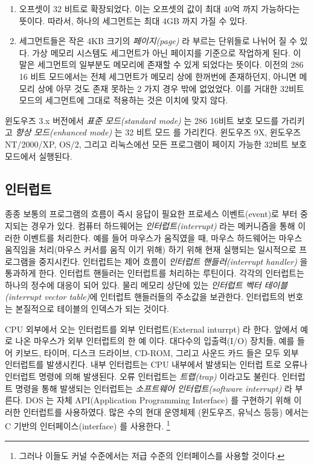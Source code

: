 \begin{enumerate}
\item

오프셋이 32 비트로 확장되었다. 이는 오프셋의 값이 최대 40억 까지 가능하다는 뜻이다. 따라서, 하나의 세그먼트는 최대 4GB 까지 가질 수 있다. 

\item

세그먼트들은  작은 4KB 크기의 \emph{페이지(page)}  라 부르는 단위들로 나뉘어 질 수 있다. 
가상 메모리  시스템도 세그먼트가 아닌 페이지를 기준으로 작업하게 된다. 이 말은 세그먼트의 일부분도 
메모리에 존재할 수 있게 되었다는 뜻이다. 이전의 286 16 비트 모드에서는 전체 세그먼트가 메모리 상에 한꺼번에 존재하던지, 아니면 메모리 상에 
아무 것도 존재 못하는 2 가지 경우 밖에 없었었다. 이를 거대한 32비트 모드의 세그먼트에 그대로 적용하는 것은 이치에 맞지 않다.  

\end{enumerate}


윈도우즈 3.x 버전에서 \emph{표준 모드(standard mode)} 는 286 16비트 보호 모드를 가리키고 \emph{향상 모드(enhanced mode)} 는 32 비트 모드
를 가리킨다. 윈도우즈 9X, 윈도우즈 NT/2000/XP, OS/2, 그리고 리눅스에선 모든 프로그램이 페이지 가능한 32비트 보호 모드에서 실행된다. 
\subsection{인터럽트}
종종 보통의 프로그램의 흐름이 즉시 응답이 필요한 프로세스 이벤트(event)로 부터 중지되는 경우가 있다. 컴퓨터 하드웨어는 \emph{인터럽트(interrupt)} 라는
메커니즘을 통해 이러한 이벤트를 처리한다. 예를 들어 마우스가 움직였을 때, 마우스 하드웨어는 마우스 움직임을 처리(마우스 커서를 움직
이기 위해) 하기 위해 현재 실행되는 일시적으로 프로그램을 중지시킨다. 인터럽트는 제어 흐름이 \emph{인터럽트 핸들러(interrupt handler)} 을 통과하게
한다. 인터럽트 핸들러는 인터럽트를 처리하는 루틴이다. 각각의 인터럽트는 하나의 정수에 대응이 되어 있다.
물리 메모리 상단에 있는 \emph{인터럽트 벡터 테이블(interrupt vector table)}에 인터럽트 핸들러들의 주소값을 보관한다. 인터럽트의 번호는 본질적으로 테이블의
인덱스가 되는 것이다. 

CPU 외부에서 오는 인터럽트를 외부 인터럽트(External inturrpt) 라 한다. 앞에서 예로 나온 마우스가 외부 인터럽트의 한 예 이다. 대다수의 입출력(I/O) 장치들, 예를 
들어 키보드, 타이머, 디스크 드라이브, CD-ROM, 그리고 사운드 카드 들은 모두 외부 인터럽트를 발생시킨다. 내부 인터럽트는 CPU 내부에서 발생되는 인터럽
트로 오류나 인터럽트 명령에 의해 발생된다. 오류 인터럽트는 \emph{트랩(trap)} 이라고도 불린다. 인터럽트 명령을 통해 발생되는 인터럽트는 
\emph{소프트웨어 인터럽트(software interrupt)} 라 부른다. DOS 는 자체 API(Application Programming Interface) 를 구현하기 위해 이러한 인터럽트를 
사용하였다. 많은 수의 현대 운영체제 (윈도우즈, 유닉스 등등) 에서는 C 기반의 인터페이스(interface) 를 사용한다. 
\footnote{그러나 이들도 커널 수준에서는 저급 수준의 인터페이스를 사용할 것이다.}

